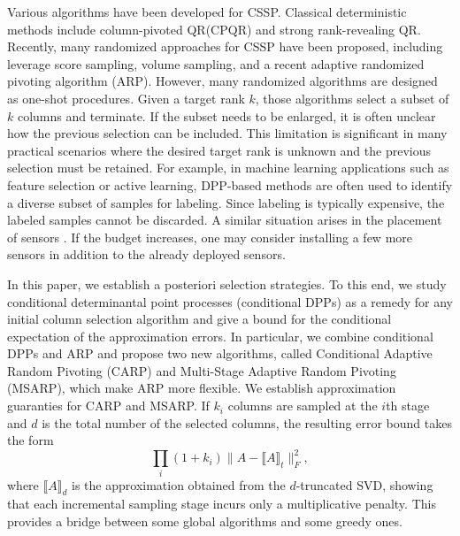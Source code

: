 \documentclass[11pt]{article}
\newcommand{\<}{\langle}
\renewcommand{\>}{\rangle}
\begin{document}
Various algorithms have been developed for CSSP. Classical deterministic methods include column-pivoted QR(CPQR) and strong rank-revealing QR\cite{srrqr}. Recently, many randomized approaches for CSSP have been proposed, including leverage score sampling, volume sampling\cite{volume_sampling1}, and a recent adaptive randomized pivoting algorithm (ARP)\cite{cortinovis2025arp}. However, many randomized algorithms are designed as one-shot procedures. Given a target rank $k$, those algorithms select a subset of $k$ columns and terminate. If the subset needs to be enlarged, it is often unclear how the previous selection can be included. This limitation is significant in many practical scenarios where the desired target rank is unknown and the previous selection must be retained. For example, in machine learning applications such as feature selection or active learning\cite{Ash2020Deep}, DPP-based methods are often used to identify a diverse subset of samples for labeling. Since labeling is typically expensive, the labeled samples cannot be discarded. A similar situation arises in the placement of  sensors \cite{hibbard2023randomized} \cite{krause2008near}. If the budget increases, one may consider installing a few more sensors in addition to the already deployed sensors.

In this paper, we establish a posteriori selection strategies. To this end, we study conditional determinantal point processes (conditional DPPs) as a remedy for any initial column selection algorithm and give a bound for the conditional expectation of the approximation errors. In particular, we combine conditional DPPs and ARP and propose two new algorithms, called Conditional Adaptive Random Pivoting (CARP) and Multi-Stage Adaptive Random Pivoting (MSARP), which make ARP more flexible. We establish approximation guaranties for CARP and MSARP. If $k_i$ columns are sampled at the $i$th stage and $d$ is the total number of the selected columns, the resulting error bound takes the form
\[
\prod_{i}(1+k_i)\|A-\llbracket A \rrbracket_t\|_F^2,
\]
where $\llbracket A \rrbracket_d$ is the approximation obtained from the $d$-truncated SVD, 
showing that each incremental sampling stage incurs only a multiplicative penalty. This provides a bridge between some global algorithms and some greedy ones.
\end{document}
